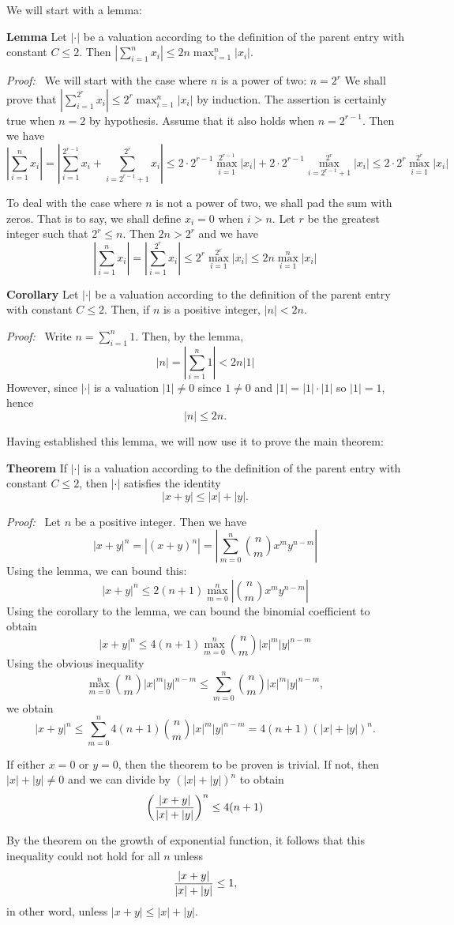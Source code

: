 \documentclass[12pt]{article}
\begin{document}
We will start with a lemma:

\textbf{Lemma}  Let $| \cdot |$ be a valuation according to the definition of the parent entry with constant $C \le 2$.  Then $\left| \sum_{i=1}^n x_i \right| \le 2n \max_{i=1}^n |x_i|$.

\emph{Proof:} \, We will start with the case where $n$ is a power of two: $n = 2^r$  We shall prove that $\left| \sum_{i=1}^{2^r} x_i \right| \le 2^r \max_{i=1}^n |x_i|$ by induction.  The assertion is certainly true when $n = 2$ by hypothesis.  Assume that it also holds when $n = 2^{r-1}$.  Then we have
 $$\left| \sum_{i=1}^n x_i \right| = \left| \sum_{i=1}^{2^{r-1}} x_i + \sum_{i=2^{r-1}+1}^{2^r} x_i \right| \le 2 \cdot 2^{r-1} \max_{i=1}^{2^{r-1}} |x_i| + 2 \cdot 2^{r-1} \max_{i=2^{r-1}+1}^{2^r} |x_i| \le 2 \cdot 2^r \max_{i=1}^{2^r} |x_i|$$

To deal with the case where $n$ is not a power of two, we shall pad the sum with zeros.  That is to say, we shall define $x_i = 0$ when $i > n$.  Let $r$ be the greatest integer such that $2^r \le n$.  Then $2 n > 2^r$ and we have 
 $$\left| \sum_{i=1}^n x_i \right| = \left| \sum_{i=1}^{2^r} x_i \right| \le 2^r \max_{i=1}^{2^r} |x_i| \le 2n \max_{i=1}^n |x_i|$$

\textbf{Corollary}  Let $| \cdot |$ be a valuation according to the definition of the parent entry with constant $C \le 2$.  Then, if $n$ is a positive integer, $|n| < 2 n$.

\emph{Proof:} \, Write $n = \sum_{i=1} ^n 1$.  Then, by the lemma,
 $$|n| = \left| \sum_{i=1} ^n 1 \right| < 2n |1|$$
However, since $| \cdot |$ is a valuation $|1| \neq 0$ since $1 \neq 0$ and $|1| = |1| \cdot |1|$ so $|1| = 1$, hence
 $$|n| \le 2n.$$

Having established this lemma, we will now use it to prove the main theorem:

\textbf{Theorem}  If $| \cdot |$ is a valuation according to the definition of the parent entry with constant $C \le 2$, then $| \cdot |$ satisfies the identity
 $$| x + y | \le |x| + |y|.$$

\emph{Proof:}  \, Let $n$ be a positive integer.  Then we have
 $$|x + y|^n = |(x+y)^n| = \left| \sum_{m=0}^n {n \choose m} x^m y^{n-m} \right|$$
Using the lemma, we can bound this:
 $$|x + y|^n \le 2 (n+1) \max_{m=0}^n \left| {n \choose m} x^m y^{n-m} \right|$$
Using the corollary to the lemma, we can bound the binomial coefficient to obtain
 $$|x + y|^n \le 4 (n+1) \max_{m=0}^n {n \choose m} |x|^m |y|^{n-m}$$
Using the obvious inequality
 $$\max_{m=0}^n {n \choose m} |x|^m |y|^{n-m} \le \sum_{m=0}^n {n \choose m} |x|^m |y|^{n-m},$$
we obtain
 $$|x + y|^n \le \sum_{m=0}^n 4 (n+1) {n \choose m} |x|^m |y|^{n-m} = 4 (n+1) (|x| + |y|)^n.$$

If either $x = 0$ or $y = 0$, then the theorem to be proven is trivial.  If not, then $|x| + |y| \neq 0$ and we can divide by $(|x| + |y|)^n$ to obtain
 $$\left( {|x+y| \over |x| + |y|} \right)^n \le 4 (n+1)$$

By the theorem on the growth of exponential function, it follows that this inequality could not hold for all $n$ unless
 $${|x+y| \over |x| + |y|} \le 1,$$
in other word, unless $|x + y| \le |x| + |y|$.
\end{document}
